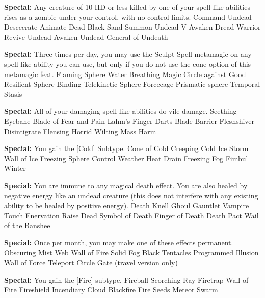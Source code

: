 \begin{multicols}{2}

\textbf{Special: }{Any creature of 10 HD or less killed by one of your spell-like abilities rises as a zombie under your control, with no control limits.}
\sphere
{Command Undead}
{Descecrate}
{Animate Dead}
{Black Sand}
{Summon Undead V}
{Awaken Dread Warrior}
{Revive Undead}
{Awaken Undead}
{General of Undeath}

\textbf{Special: }{Three times per day, you may use the Sculpt Spell metamagic on any spell-like ability you can use, but only if you do not use the cone option of this metamagic feat.}
\sphere
{Flaming Sphere}
{Water Breathing}
{Magic Circle against Good}
{Resilient Sphere}
{Binding}
{Telekinetic Sphere}
{Forcecage}
{Prismatic sphere}
{Temporal Stasis}

\textbf{Special: }{All of your damaging spell-like abilities do vile damage.}
\sphere
{Seething Eyebane}
{Blade of Fear and Pain}
{Lahm's Finger Darts}
{Blade Barrier}
{Fleshshiver}
{Disintigrate}
{Flensing}
{Horrid Wilting}
{Mass Harm}

\textbf{Special: }{You gain the [Cold] Subtype.}
\sphere
{Cone of Cold}
{Creeping Cold}
{Ice Storm}
{Wall of Ice}
{Freezing Sphere}
{Control Weather}
{Heat Drain}
{Freezing Fog}
{Fimbul Winter}

\textbf{Special: }{You are immune to any magical death effect. You are also healed by negative energy like an undead creature (this does not interfere with any existing ability to be healed by positive energy).}
\sphere
{Death Knell}
{Ghoul Gauntlet}
{Vampire Touch}
{Enervation}
{Raise Dead}
{Symbol of Death}
{Finger of Death}
{Death Pact}
{Wail of the Banshee}

\textbf{Special: }{Once per month, you may make one of these effects permanent.}
\sphere
{Obscuring Mist}
{Web}
{Wall of Fire}
{Solid Fog}
{Black Tentacles}
{Programmed Illusion}
{Wall of Force}
{Teleport Circle}
{Gate (travel version only)}

\textbf{Special: }{You gain the [Fire] subtype.}
\sphere
{Fireball}
{Scorching Ray}
{Firetrap}
{Wall of Fire}
{Fireshield}
{Incendiary Cloud}
{Blackfire}
{Fire Seeds}
{Meteor Swarm}


\end{multicols}

